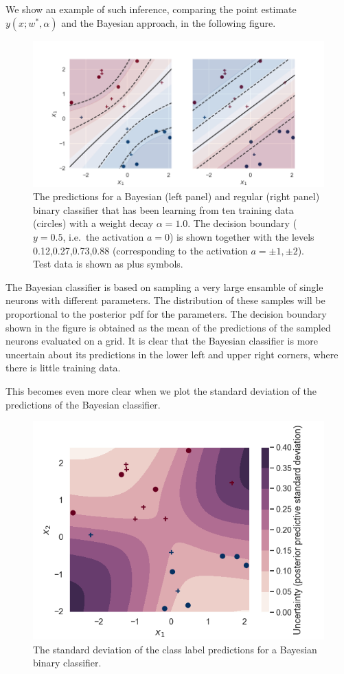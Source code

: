 \documentclass[%
oneside,                 %
final,                   %
10pt]{article}
\begin{document}
We show an example of such inference, comparing the point estimate $y(x; w^*, \alpha)$ and the Bayesian approach, in the following figure.


\begin{figure}[!ht]  %
  \centerline{\includegraphics[width=0.95\linewidth]{fig/bnn_binary_classifier_mean.png}}
  \caption{
  The predictions for a Bayesian (left panel) and regular (right panel) binary classifier that has been learning from ten training data (circles) with a weight decay $\alpha = 1.0$. The decision boundary ($y=0.5$, i.e.~the activation $a=0$) is shown together with the levels 0.12,0.27,0.73,0.88 (corresponding to the activation $a=\pm1,\pm2$). Test data is shown as plus symbols.
  }
\end{figure}


The Bayesian classifier is based on sampling a very large ensamble of single neurons with different parameters. The distribution of these samples will be proportional to the posterior pdf for the parameters. The decision boundary shown in the figure is obtained as the mean of the predictions of the sampled neurons evaluated on a grid. It is clear that the Bayesian classifier is more uncertain about its predictions in the lower left and upper right corners, where there is little training data. 

This becomes even more clear when we plot the standard deviation of the predictions of the Bayesian classifier.


\begin{figure}[!ht]  %
  \centerline{\includegraphics[width=0.8\linewidth]{fig/bnn_binary_classifier_stddev.png}}
  \caption{
  The standard deviation of the class label predictions for a Bayesian binary classifier.
  }
\end{figure}
\end{document}
